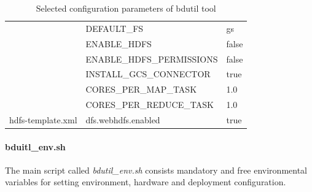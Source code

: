 \documentclass[a4paper,12pt,oneside]{report}
\begin{document}
\begin{table}[!htbp]
\begin{scriptsize}
\begin{tabular}{@{}lll@{}}
\multicolumn{1}{|l|}{}                                 & \multicolumn{1}{l|}{DEFAULT\_FS}                  & \multicolumn{1}{l|}{gs}                 \\ \cmidrule(l){2-3} 
\multicolumn{1}{|l|}{}                                 & \multicolumn{1}{l|}{ENABLE\_HDFS}                 & \multicolumn{1}{l|}{false}              \\ \cmidrule(l){2-3} 
\multicolumn{1}{|l|}{}                                 & \multicolumn{1}{l|}{ENABLE\_HDFS\_PERMISSIONS}    & \multicolumn{1}{l|}{false}              \\ \cmidrule(l){2-3} 
\multicolumn{1}{|l|}{}                                 & \multicolumn{1}{l|}{INSTALL\_GCS\_CONNECTOR}      & \multicolumn{1}{l|}{true}               \\ \cmidrule(l){2-3} 
\multicolumn{1}{|l|}{}                                 & \multicolumn{1}{l|}{CORES\_PER\_MAP\_TASK}        & \multicolumn{1}{l|}{1.0}                \\ \cmidrule(l){2-3} 
\multicolumn{1}{|l|}{}                                 & \multicolumn{1}{l|}{CORES\_PER\_REDUCE\_TASK}     & \multicolumn{1}{l|}{1.0}                \\ \midrule
\multicolumn{1}{|l|}{hdfs-template.xml}                & \multicolumn{1}{l|}{dfs.webhdfs.enabled}          & \multicolumn{1}{l|}{true}               \\ \midrule

\end{tabular}
\caption{Selected configuration parameters of bdutil tool}
\label{bdutil:config.sh}
\end{scriptsize}
\end{table}
\paragraph{bduitl\_env.sh}\label{bdutilenv}The main script called \textit{bdutil\_env.sh} consists mandatory 
and free environmental variables for setting environment, hardware and deployment configuration.
\end{document}
